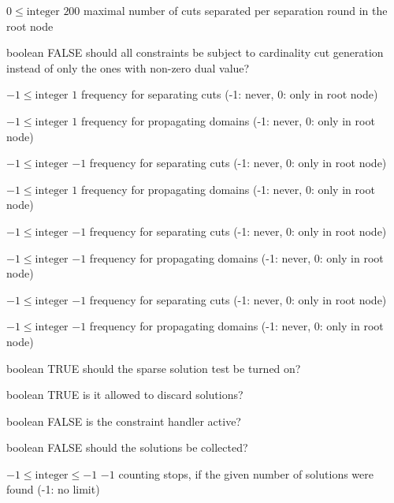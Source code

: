 %
{$0\leq\textrm{integer}$}%
{$200$}%
{maximal number of cuts separated per separation round in the root node}%
{}

%
{boolean}%
{FALSE}%
{should all constraints be subject to cardinality cut generation instead of only the ones with non-zero dual value?}%
{}

%
{$-1\leq\textrm{integer}$}%
{$1$}%
{frequency for separating cuts (-1: never, 0: only in root node)}%
{}

%
{$-1\leq\textrm{integer}$}%
{$1$}%
{frequency for propagating domains (-1: never, 0: only in root node)}%
{}

%
{$-1\leq\textrm{integer}$}%
{$-1$}%
{frequency for separating cuts (-1: never, 0: only in root node)}%
{}

%
{$-1\leq\textrm{integer}$}%
{$1$}%
{frequency for propagating domains (-1: never, 0: only in root node)}%
{}

%
{$-1\leq\textrm{integer}$}%
{$-1$}%
{frequency for separating cuts (-1: never, 0: only in root node)}%
{}

%
{$-1\leq\textrm{integer}$}%
{$-1$}%
{frequency for propagating domains (-1: never, 0: only in root node)}%
{}

%
{$-1\leq\textrm{integer}$}%
{$-1$}%
{frequency for separating cuts (-1: never, 0: only in root node)}%
{}

%
{$-1\leq\textrm{integer}$}%
{$-1$}%
{frequency for propagating domains (-1: never, 0: only in root node)}%
{}

%
{boolean}%
{TRUE}%
{should the sparse solution test be turned on?}%
{}

%
{boolean}%
{TRUE}%
{is it allowed to discard solutions?}%
{}

%
{boolean}%
{FALSE}%
{is the constraint handler active?}%
{}

%
{boolean}%
{FALSE}%
{should the solutions be collected?}%
{}

%
{$-1\leq\textrm{integer}\leq-1$}%
{$-1$}%
{counting stops, if the given number of solutions were found (-1: no limit)}%
{}

